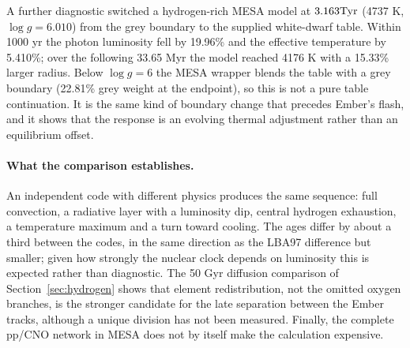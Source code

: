 A further diagnostic switched a hydrogen-rich MESA model at $3.163\mathrm{Tyr}$
(4737 K, $\log g=6.010$) from the grey boundary to the supplied white-dwarf
table. Within 1000 yr the photon luminosity fell by 19.96\% and the
effective temperature by 5.410\%; over the following 33.65 Myr the model
reached 4176 K with a 15.33\% larger radius. Below $\log g=6$ the MESA
wrapper blends the table with a grey boundary (22.81\% grey weight at the
endpoint), so this is not a pure table continuation. It is the same kind of
boundary change that precedes Ember's flash, and it shows that the response
is an evolving thermal adjustment rather than an equilibrium offset.

\paragraph{What the comparison establishes.}
An independent code with different physics produces the same sequence: full
convection, a radiative layer with a luminosity dip, central hydrogen
exhaustion, a temperature maximum and a turn toward cooling. The ages differ
by about a third between the codes, in the same direction as the LBA97
difference but smaller; given how strongly the nuclear clock depends on
luminosity this is expected rather than diagnostic. The 50 Gyr diffusion
comparison of Section~\ref{sec:hydrogen} shows that element redistribution,
not the omitted oxygen branches, is the stronger candidate for the late
separation between the Ember tracks, although a unique division has not been
measured. Finally, the complete pp/CNO network in MESA does not by itself
make the calculation expensive.
